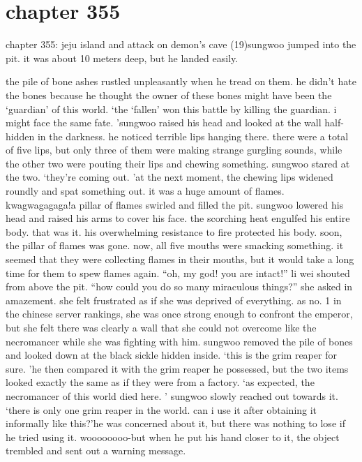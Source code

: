 \section{chapter 355}

chapter 355: jeju island and attack on demon’s cave (19)sungwoo jumped into the pit.
 it was about 10 meters deep, but he landed easily.





the pile of bone ashes rustled unpleasantly when he tread on them.
 he didn’t hate the bones because he thought the owner of these bones might have been the ‘guardian’ of this world.
‘the ‘fallen’ won this battle by killing the guardian.
 i might face the same fate.
’sungwoo raised his head and looked at the wall half-hidden in the darkness.
 he noticed terrible lips hanging there.
 there were a total of five lips, but only three of them were making strange gurgling sounds, while the other two were pouting their lips and chewing something.
sungwoo stared at the two.
‘they’re coming out.
’at the next moment, the chewing lips widened roundly and spat something out.
 it was a huge amount of flames.
kwagwagagaga!a pillar of flames swirled and filled the pit.
 sungwoo lowered his head and raised his arms to cover his face.
 the scorching heat engulfed his entire body.
 that was it.
 his overwhelming resistance to fire protected his body.
soon, the pillar of flames was gone.
 now, all five mouths were smacking something.
it seemed that they were collecting flames in their mouths, but it would take a long time for them to spew flames again.
“oh, my god! you are intact!” li wei shouted from above the pit.
“how could you do so many miraculous things?” she asked in amazement.
she felt frustrated as if she was deprived of everything.
 as no.
 1 in the chinese server rankings, she was once strong enough to confront the emperor, but she felt there was clearly a wall that she could not overcome like the necromancer while she was fighting with him.
sungwoo removed the pile of bones and looked down at the black sickle hidden inside.
‘this is the grim reaper for sure.
’he then compared it with the grim reaper he possessed, but the two items looked exactly the same as if they were from a factory.
‘as expected, the necromancer of this world died here.
’
sungwoo slowly reached out towards it.
‘there is only one grim reaper in the world.
 can i use it after obtaining it informally like this?’he was concerned about it, but there was nothing to lose if he tried using it.
woooooooo-but when he put his hand closer to it, the object trembled and sent out a warning message.
